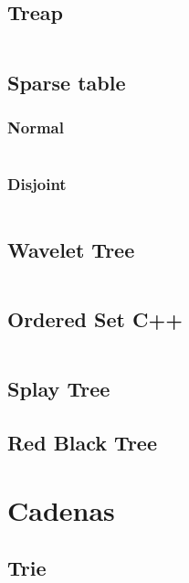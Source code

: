\documentclass[11pt]{article}
\begin{document}
		\subsection{Treap}
		\inputminted[tabsize=2,breaklines,firstline=531,lastline=796,fontsize=\small]{c++}{queries.cpp}
		
		\subsection{Sparse table}
			\subsubsection{Normal}
			\inputminted[tabsize=2,breaklines,firstline=798,lastline=833,fontsize=\small]{c++}{queries.cpp}
		
			\subsubsection{Disjoint}
			\inputminted[tabsize=2,breaklines,firstline=835,lastline=868,fontsize=\small]{c++}{queries.cpp}
			
		\subsection{Wavelet Tree}
		\inputminted[tabsize=2,breaklines,firstline=870,lastline=933,fontsize=\small]{c++}{queries.cpp}
		
		\subsection{Ordered Set C++}
		\inputminted[tabsize=2,breaklines,firstline=935,lastline=969,fontsize=\small]{c++}{queries.cpp}
		
		\subsection{Splay Tree}
		
		
		\subsection{Red Black Tree}
		
		
	\newpage
	\section{Cadenas}
		\subsection{Trie}
		\inputminted[tabsize=2,breaklines,firstline=144,lastline=196,fontsize=\small]{c++}{strings.cpp}
		
\end{document}
